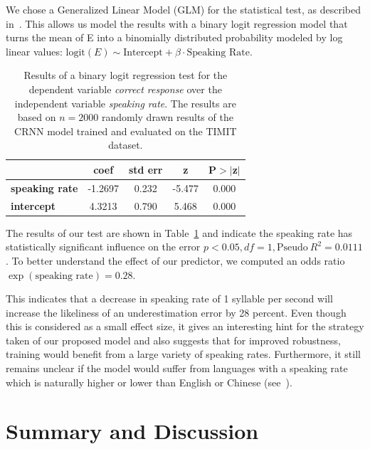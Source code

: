 We chose a Generalized Linear Model (GLM) for the statistical test, as described in~\cite{jaeger08}.
This allows us model the results with a binary logit regression model that turns the mean of E into a binomially distributed probability modeled by log linear values: \(\mbox{logit}(E) \sim \mbox{Intercept} + \beta \cdot{\mbox{Speaking Rate}}\).
\begin{table}[t]
\begin{center}
\begin{tabular}{lcccc}
\toprule
                        & \textbf{coef} & \textbf{std err} & \textbf{z} & \textbf{P$>$$|$z$|$} \\
\midrule
\textbf{speaking rate} &      -1.2697   &        0.232     &     -5.477  &         0.000        \\
\textbf{intercept}          &      4.3213  &        0.790     &    5.468  &         0.000  \\
\bottomrule
\end{tabular}
\caption{Results of a binary logit regression test for the dependent variable \emph{correct response} over the independent variable \emph{speaking rate}. The results are based on $n=2000$ randomly drawn results of the CRNN model trained and evaluated on the TIMIT dataset.}%
\label{tab:logit}
\end{center}
\end{table}
The results of our test are shown in Table~\ref{tab:logit} and indicate the speaking rate has statistically significant influence on the error \(p < 0.05, df=1, \textrm{Pseudo}\ R^2=0.0111\).
To better understand the effect of our predictor, we computed an odds ratio \(\exp(\mbox{speaking rate}) = 0.28\).\par
This indicates that a decrease in speaking rate of 1 syllable per second will increase the likeliness of an underestimation error by 28 percent.
Even though this is considered as a small effect size, it gives an interesting hint for the strategy taken of our proposed model and also suggests that for improved robustness, training would benefit from a large variety of speaking rates.
Furthermore, it still remains unclear if the model would suffer from languages with a speaking rate which is naturally higher or lower than English or Chinese (see~\cite{Osser64}).

\section{Summary and Discussion}%
\label{sec:conclusion}

